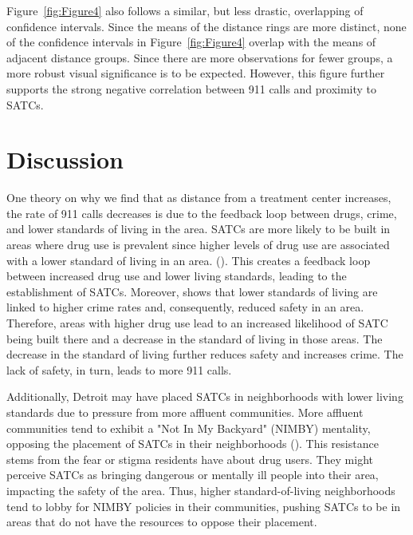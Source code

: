 \documentclass[12pt]{article}
\begin{document}
Figure~\ref{fig:Figure4} also follows a similar, but less drastic, overlapping of confidence intervals. Since the means of the distance rings are more distinct, none of the confidence intervals in Figure~\ref{fig:Figure4} overlap with the means of adjacent distance groups. Since there are more observations for fewer groups, a more robust visual significance is to be expected. However, this figure further supports the strong negative correlation between 911 calls and proximity to SATCs. 


\section{Discussion}
\label{sec:discussion}

One theory on why we find that as distance from a treatment center increases, the rate of 911 calls decreases is due to the feedback loop between drugs, crime, and lower standards of living in the area. SATCs are more likely to be built in areas where drug use is prevalent since higher levels of drug use are associated with a lower standard of living in an area. (\cite{drugs_and_crime}). This creates a feedback loop between increased drug use and lower living standards, leading to the establishment of SATCs. Moreover, \cite{drugs_and_crime} shows that lower standards of living are linked to higher crime rates and, consequently, reduced safety in an area. Therefore, areas with higher drug use lead to an increased likelihood of SATC being built there and a decrease in the standard of living in those areas. The decrease in the standard of living further reduces safety and increases crime. The lack of safety, in turn, leads to more 911 calls.  

Additionally, Detroit may have placed SATCs in neighborhoods with lower living standards due to pressure from more affluent communities. More affluent communities tend to exhibit a "Not In My Backyard" (NIMBY) mentality, opposing the placement of SATCs in their neighborhoods (\citealp{NIMBY}). This resistance stems from the fear or stigma residents have about drug users. They might perceive SATCs as bringing dangerous or mentally ill people into their area, impacting the safety of the area. Thus, higher standard-of-living neighborhoods tend to lobby for NIMBY policies in their communities, pushing SATCs to be in areas that do not have the resources to oppose their placement.
\end{document}

